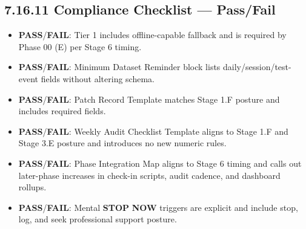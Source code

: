 \documentclass[10pt]{article}
\begin{document}
\subsection*{7.16.11 Compliance Checklist — Pass/Fail}
{}

\begin{itemize}
\item \textbf{PASS}/\textbf{FAIL}: Tier 1 includes offline-capable fallback and is required by Phase 00 (E) per Stage 6 timing.
\item \textbf{PASS}/\textbf{FAIL}: Minimum Dataset Reminder block lists daily/session/test-event fields without altering schema.
\item \textbf{PASS}/\textbf{FAIL}: Patch Record Template matches Stage 1.F posture and includes required fields.
\item \textbf{PASS}/\textbf{FAIL}: Weekly Audit Checklist Template aligns to Stage 1.F and Stage 3.E posture and introduces no new numeric rules.
\item \textbf{PASS}/\textbf{FAIL}: Phase Integration Map aligns to Stage 6 timing and calls out later-phase increases in check-in scripts, audit cadence, and dashboard rollups.
\item \textbf{PASS}/\textbf{FAIL}: Mental \textbf{STOP} \textbf{NOW} triggers are explicit and include stop, log, and seek professional support posture.
\end{itemize}
\end{document}
